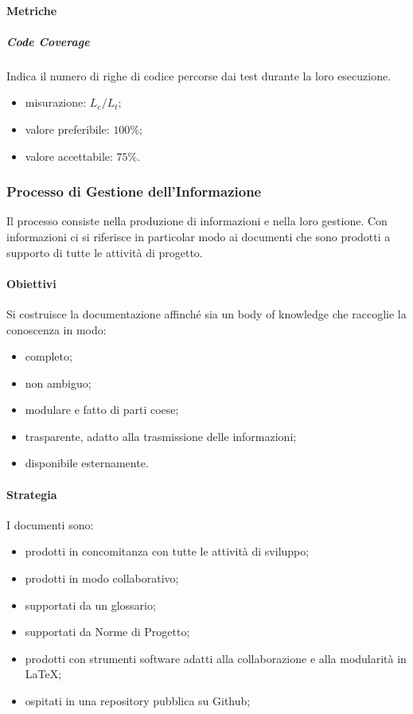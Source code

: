 		\paragraph{Metriche}
			\subparagraph{Code Coverage}
				Indica il numero di righe di codice percorse dai test durante la loro esecuzione. 
				\begin{itemize}
					\item misurazione: $L_e/L_t$;
					\item valore preferibile: $100\%$;
					\item valore accettabile: $75\%$.
				\end{itemize}

	\subsubsection{Processo di Gestione dell'Informazione}
	Il processo consiste nella produzione di informazioni e nella loro gestione. Con informazioni ci si riferisce in particolar modo ai documenti che sono prodotti a supporto di tutte le attività di progetto.
		\paragraph{Obiettivi}
			Si costruisce la documentazione affinché sia un body of knowledge %
			che raccoglie la conoscenza in modo:
			\begin{itemize}
				\item completo;
				\item non ambiguo;
				\item modulare e fatto di parti coese;
				\item trasparente, adatto alla trasmissione delle informazioni;
				\item disponibile esternamente.
			\end{itemize}
		\paragraph{Strategia}
		I documenti sono:
		\begin{itemize}
			\item prodotti in concomitanza con tutte le attività di sviluppo;
			\item prodotti in modo collaborativo;
			\item supportati da un glossario;
			\item supportati da Norme di Progetto;
			\item prodotti con strumenti software adatti alla collaborazione e alla modularità in \LaTeX{};
			\item ospitati in una repository pubblica su Github;
		\end{itemize}
